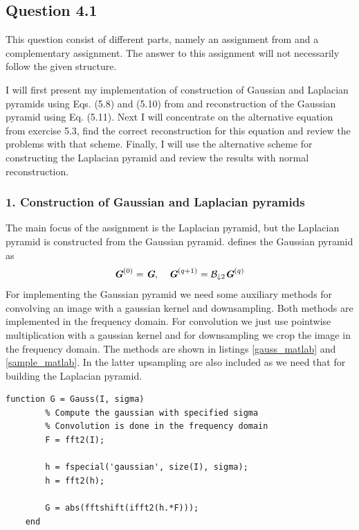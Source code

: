 \documentclass[a4paper, 10pt, final]{article}
\title{\mytitle}
\subtitle{\mysubtitle}
\author{\myauthor{} - \mymail}
\date{\mydate}
\begin{document}
\maketitle

\subsection*{Question 4.1}
This question consist of different parts, namely an assignment from
\citep{jahne-digital} and a complementary assignment. The answer to this
assignment will not necessarily follow the given structure.

I will first present my implementation of construction of Gaussian and
Laplacian pyramids using Eqs. (5.8) and (5.10) from
\citep{jahne-digital} and reconstruction of the Gaussian pyramid using
Eq. (5.11). Next I will concentrate on the alternative equation from
\citep{jahne-digital} exercise 5.3, find the correct reconstruction for
this equation and review the problems with that scheme. Finally, I will
use the alternative scheme for constructing the Laplacian pyramid and
review the results with normal reconstruction.

\subsubsection*{1. Construction of Gaussian and Laplacian pyramids}
The main focus of the assignment is the Laplacian pyramid, but the
Laplacian pyramid is constructed from the Gaussian pyramid.
\citep[Eq. (5.8)]{jahne-digital} defines the Gaussian pyramid as
\begin{equation}
    \textbf{\em G}^{(0)} = \textbf{\em G}, ~~~\textbf{\em G}^{(q + 1)} =
    \mathcal{B}_{\downarrow 2}\textbf{\em G}^{(q)}
    \label{gauss_pyr_def}
\end{equation}
For implementing the Gaussian pyramid we need some auxiliary methods for
convolving an image with a gaussian kernel and downsampling. Both
methods are implemented in the frequency domain. For convolution we just
use pointwise multiplication with a gaussian kernel and for downsampling
we crop the image in the frequency domain. The methods are shown in
listings \ref{gauss_matlab} and \ref{sample_matlab}. In the latter
upsampling are also included as we need that for building the Laplacian
pyramid.

\begin{lstlisting}[caption={Convolution with a gaussian kernel in the
    frequency domain.}, captionpos=b,
    label={gauss_matlab}, float=b, numbers=none]
    function G = Gauss(I, sigma)
        % Compute the gaussian with specified sigma
        % Convolution is done in the frequency domain
        F = fft2(I);
        
        h = fspecial('gaussian', size(I), sigma);
        h = fft2(h);
                
        G = abs(fftshift(ifft2(h.*F)));
    end
\end{lstlisting}
\end{document}
